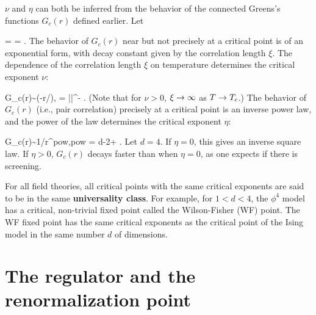 $\nu$ and $\eta$
can both be inferred
from the behavior of the connected Greens's functions $G_c(r)$
defined earlier. Let

\beq
\theta = =
\;.
\eeq
The behavior of $G_c(r)$ near but not precisely
at a critical point is of an
exponential form, with decay
constant given by the correlation length $\xi$.
The dependence of the correlation length $\xi$ on temperature
determines the critical exponent $\nu$:

\beq
G_c(r)\sim \exp(-r/\xi),
\;\;
\xi = |\theta|^{-\nu}
\;.
\eeq
(Note that for $\nu>0$,
$\xi\rightarrow \infty$ as $T\rightarrow T_c$.)
The behavior of $G_c(r)$ (i.e., pair correlation) precisely at
a critical point is an inverse power
law, and the power of the law
determines the critical exponent $\eta$:


\beq
G_c(r)\sim 1/r^{pow},\;\;pow = d-2+\eta
\;.
\eeq
Let $d=4$. If $\eta=0$, this gives
an inverse square law. If $\eta>0$,
$G_c(r)$ decays faster than
when $\eta=0$,
as one expects if there is screening.

For all
field theories, all critical points
with the same critical exponents
 are
said to be in the same
\textbf{universality class}.
For example, for $1<d< 4$, the $\phi^4$ model
has a critical, non-trivial fixed point called the Wilson-Fisher (WF) point. The WF fixed point
 has the same critical exponents
as the critical point
of the Ising model in the
same number  $d$ of dimensions.








\section{The regulator and the renormalization point}
\label{sec-regulator}

